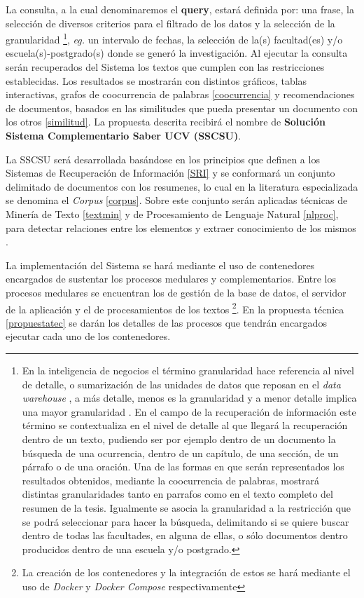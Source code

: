 \documentclass[
  10,
  spanish,
  openany]{book}
\begin{document}
La consulta, a la cual denominaremos el \textbf{query}, estará definida por: una frase, la selección de diversos criterios para el filtrado de los datos y la selección de la granularidad \footnote{En la inteligencia de negocios el término granularidad hace referencia al nivel de detalle, o sumarización de las unidades de datos que reposan en el \emph{data warehouse} , a más detalle, menos es la granularidad y a menor detalle implica una mayor granularidad \citep{inmon2002}. En el campo de la recuperación de información este término se contextualiza en el nivel de detalle al que llegará la recuperación dentro de un texto, pudiendo ser por ejemplo dentro de un documento la búsqueda de una ocurrencia, dentro de un capítulo, de una sección, de un párrafo o de una oración. Una de las formas en que serán representados los resultados obtenidos, mediante la coocurrencia de palabras, mostrará distintas granularidades tanto en parrafos como en el texto completo del resumen de la tesis. Igualmente se asocia la granularidad a la restricción que se podrá seleccionar para hacer la búsqueda, delimitando si se quiere buscar dentro de todas las facultades, en alguna de ellas, o sólo documentos dentro producidos dentro de una escuela y/o postgrado.}, \emph{eg.} un intervalo de fechas, la selección de la(s) facultad(es) y/o escuela(s)-postgrado(s) donde se generó la investigación. Al ejecutar la consulta serán recuperados del Sistema los textos que cumplen con las restricciones establecidas. Los resultados se mostrarán con distintos gráficos, tablas interactivas, grafos de coocurrencia de palabras \ref{coocurrencia} y recomendaciones de documentos, basados en las similitudes que pueda presentar un documento con los otros \ref{similitud}. La propuesta descrita recibirá el nombre de \textbf{Solución Sistema Complementario Saber UCV (SSCSU)}.

La SSCSU será desarrollada basándose en los principios que definen a los Sistemas de Recuperación de Información \ref{SRI} y se conformará un conjunto delimitado de documentos con los resumenes, lo cual en la literatura especializada se denomina el \emph{Corpus} \ref{corpus}. Sobre este conjunto serán aplicadas técnicas de Minería de Texto \ref{textmin} y de Procesamiento de Lenguaje Natural \ref{nlproc}, para detectar relaciones entre los elementos y extraer conocimiento de los mismos \citep{miningt2012c}.

La implementación del Sistema se hará mediante el uso de contenedores encargados de sustentar los procesos medulares y complementarios. Entre los procesos medulares se encuentran los de gestión de la base de datos, el servidor de la aplicación y el de procesamientos de los textos \footnote{La creación de los contenedores y la integración de estos se hará mediante el uso de \emph{Docker} y \emph{Docker Compose} respectivamente}. En la propuesta técnica \ref{propuestatec} se darán los detalles de las procesos que tendrán encargados ejecutar cada uno de los contenedores.
\end{document}
